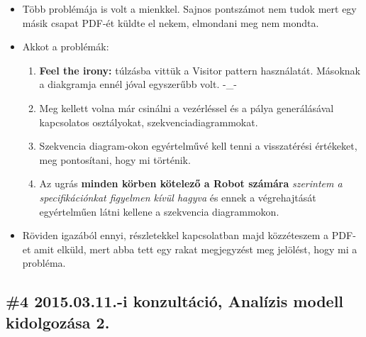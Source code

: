 \documentclass{article}
\begin{document}
\begin{itemize}
	\item Több problémája is volt a mienkkel. Sajnos pontszámot nem tudok mert egy másik csapat PDF-ét küldte el nekem, elmondani meg nem mondta.
	\item Akkot a problémák:
	\begin{enumerate}
		\item \textbf{Feel the irony:} túlzásba vittük a Visitor pattern használatát. Másoknak a diakgramja ennél jóval egyszerűbb volt. -\_-
		\item Meg kellett volna már csinálni a vezérléssel és a pálya generálásával kapcsolatos osztályokat, szekvenciadiagrammokat.
		\item Szekvencia diagram-okon egyértelművé kell tenni a visszatérési értékeket, meg pontosítani, hogy mi történik.
		\item Az ugrás \textbf{minden körben kötelező a Robot számára} \textit{szerintem a specifikációnkat figyelmen kívül hagyva} és ennek a végrehajtását egyértelműen látni kellene a szekvencia diagrammokon. 
	\end{enumerate}
	\item Röviden igazából ennyi, részletekkel kapcsolatban majd közzéteszem a PDF-et amit elküld, mert abba tett egy rakat megjegyzést meg jelölést, hogy mi a probléma.
\end{itemize}

\subsection{\#4 2015.03.11.-i konzultáció, Analízis modell kidolgozása 2.}
\end{document}
